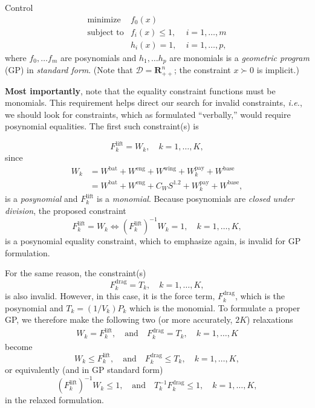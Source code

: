 \begin{chapter}{Control}
    \[
    \begin{array}{lll}
    \text{minimize} \; & f_0(x) & \\
    \text{subject to} & f_i(x) \le 1, \; & i = 1, \ldots, m \\
    & h_i(x) = 1, \; & i = 1, \ldots, p,
    \end{array}
    \]
    where $f_0, \ldots f_m$ are posynomials and $h_1, \ldots h_p$ are monomials is a \textit{geometric program} (GP)
    in \textit{standard form}. (Note that $\mathcal{D} = \mathbf{R}^n_{++}$; the constraint $x \succ 0$ is implicit.)
    
    \textbf{Most importantly}, note that the equality constraint functions must be monomials. This requirement helps direct
    our search for invalid constraints, \textit{i.e.}, we should look for constraints, which as formulated ``verbally,''
    would require posynomial equalities. The first such constraint(s) is

    \[F_k^{\mathrm{lift}} = W_k, \quad k=1, \ldots, K,\]
    since 
    \[\begin{aligned}
        W_k &= W^{\mathrm{bat}} + W^{\mathrm{eng}} + W^{\mathrm{wing}} + W^{\mathrm{pay}}_k + W^{\mathrm{base}} \\
        &=W^{\mathrm{bat}} + W^{\mathrm{eng}} + C_W S^{1.2} + W^{\mathrm{pay}}_k + W^{\mathrm{base}},
    \end{aligned}\]
    is a \textit{posynomial} and $F_k^{\mathrm{lift}}$ is a \textit{monomial}. Because posynomials are
    \textit{closed under division}, the proposed constraint \[F_k^{\mathrm{lift}} = W_k \Longleftrightarrow \left(F_k^{\mathrm{lift}}\right)^{-1}W_k = 1, \quad k=1, \ldots, K,\]
    is a posynomial equality constraint, which to emphasize again, is invalid for GP formulation.

    For the same reason, the constraint(s)
    \[F_k^{\mathrm{drag}} = T_k, \quad k=1, \ldots, K,\]
    is also invalid. However, in this case, it is the force term, $F_{k}^{\mathrm{drag}}$, which is the posynomial
    and $T_k = (1/V_k)P_k$ which is the monomial. To formulate a proper GP, we therefore make the following two (or more accurately, $2K$) relaxations
    \[\begin{aligned}
        W_k = F_{k}^{\mathrm{lift}}, \quad \text{and} \quad F_{k}^{\mathrm{drag}} = T_k, \quad k=1, \ldots, K
    \end{aligned}\]
    become
    \[
        W_k \le F_{k}^{\mathrm{lift}}, \quad \text{and} \quad F_{k}^{\mathrm{drag}} \le T_k, \quad k=1, \ldots, K, \]
    or equivalently (and in GP standard form)
        \[\left(F_{k}^{\mathrm{lift}} \right)^{-1} W_k \le 1, \quad \text{and} \quad T_k^{-1}F_{k}^{\mathrm{drag}} \le 1, \quad k=1, \ldots, K,
    \]
    in the relaxed formulation.


\end{chapter}
